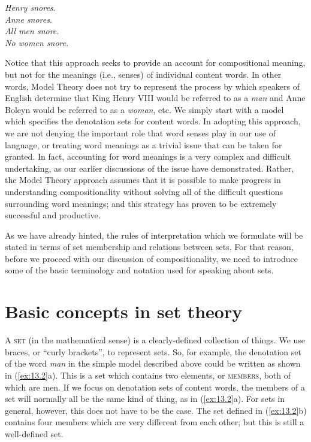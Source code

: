 \ea \label{ex:13.1}
\ea \textit{Henry snores}.\\
\ex \textit{Anne snores}.\\
\ex \textit{All men snore}.\\
\ex \textit{No women snore}.
                       \z
\z


Notice that this approach seeks to provide an account for compositional meaning, but not for the meanings (i.e., senses) of individual content words. In other words, Model Theory does not try to represent the process by which speakers of English determine that King Henry VIII would be referred to as a \textit{man} and Anne Boleyn would be referred to as a \textit{woman}, etc. We simply start with a model which specifies the denotation sets for content words. In adopting this approach, we are not denying the important role that word senses play in our use of language, or treating word meanings as a trivial issue that can be taken for granted. In fact, accounting for word meanings is a very complex and difficult undertaking, as our earlier discussions of the issue have demonstrated. Rather, the Model Theory approach assumes that it is possible to make progress in understanding compositionality without solving all of the difficult questions surrounding word meanings; and this strategy has proven to be extremely successful and productive.



As we have already hinted, the rules of interpretation which we formulate will be stated in terms of set membership and relations between sets. For that reason, before we proceed with our discussion of compositionality, we need to introduce some of the basic terminology and notation used for speaking about sets.


\section{Basic concepts in set theory}\label{sec:13.3}

A \textsc{set} (in the mathematical sense) is a clearly-defined collection of things. We use braces, or “curly brackets”, to represent sets. So, for example, the denotation set of the word \textit{man} in the simple model described above could be written as shown in (\ref{ex:13.2}a). This is a set which contains two elements, or \textsc{members}, both of which are men. If we focus on denotation sets of content words, the members of a set will normally all be the same kind of thing, as in (\ref{ex:13.2}a). For sets in general, however, this does not have to be the case. The set defined in (\ref{ex:13.2}b) contains four members which are very different from each other; but this is still a well-defined set.


